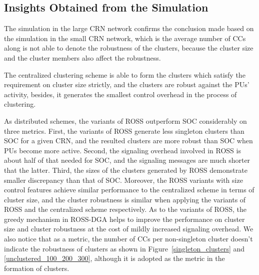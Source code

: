\documentclass[10pt,journal,compsoc]{IEEEtran}
\theoremstyle{mytheoremstyle}
\theoremstyle{mytheoremstyle}
\theoremstyle{mytheoremstyle}
\begin{document}
\subsection{Insights Obtained from the Simulation}
The simulation in the large CRN network confirms the conclusion made based on the simulation in the small CRN network, which is the average number of CCs along is not able to denote the robustness of the clusters, because the cluster size and the cluster members also affect the robustness.

The centralized clustering scheme is able to form the clusters which satisfy the requirement on cluster size strictly, and the clusters are robust against the PUs' activity, besides, it generates the smallest control overhead in the process of clustering.

As distributed schemes, the variants of ROSS outperform SOC considerably on three metrics.
First, the variants of ROSS generate less singleton clusters than SOC for a given CRN, and the resulted clusters are more robust than SOC when PUs become more active.
Second, the signaling overhead involved in ROSS is about half of that needed for SOC, and the signaling messages are much shorter that the latter.
Third, the sizes of the clusters generated by ROSS demonstrate smaller discrepancy than that of SOC.
Moreover, the ROSS variants with size control features achieve similar performance to the centralized scheme in terms of cluster size, and the cluster robustness is similar when applying the variants of ROSS and the centralized scheme respectively.
%
As to the variants of ROSS, the greedy mechanism in ROSS-DGA helps to improve the performance on cluster size and cluster robustness at the cost of mildly increased signaling overhead.
We also notice that  as a metric, the number of CCs per non-singleton cluster doesn't indicate the robustness of clusters as shown in Figure~\ref{singleton_clusters} and \ref{unclustered_100_200_300}, although it is adopted as the metric in the formation of clusters.
\end{document}
